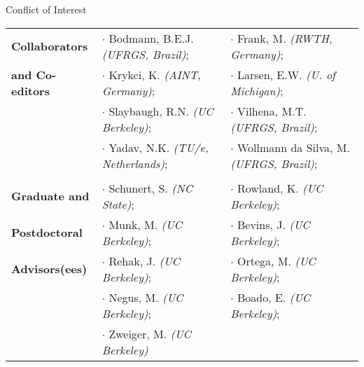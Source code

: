 \documentclass{resume3} %
\begin{document}
\vspace*{0.5em}
\begin{rSection}{Conflict of Interest}
\begin{tabular}{ @{} l @{\hspace{2ex}} l @{\hspace{3ex}} l }
\textbf{Collaborators}
& {\hspace{0em}}$\cdot$ Bodmann, B.E.J. \textit{(UFRGS, Brazil)};
& {\hspace*{0 em}}$\cdot$ Frank, M. \textit{(RWTH, Germany)};\\
\textbf{and Co-editors}
& {\hspace{0em}}$\cdot$ Krykci, K. \textit{(AINT, Germany)}; 
& {\hspace*{0 em}}$\cdot$ Larsen, E.W. \textit{(U. of Michigan)}; \\
& {\hspace{0em}}$\cdot$ Slaybaugh, R.N. \textit{(UC Berkeley)}; 
& {\hspace*{0 em}}$\cdot$ Vilhena, M.T. \textit{(UFRGS, Brazil)}; \\
& {\hspace{0em}}$\cdot$ Yadav, N.K. \textit{(TU/e, Netherlands)};
& {\hspace{0em}}$\cdot$ Wollmann da Silva, M. \textit{(UFRGS, Brazil)};\\
\quad \vspace{-5pt}\\
\textbf{Graduate and}
& {\hspace{0em}}$\cdot$ Schunert, S. \textit{(NC State)};
& {\hspace*{0 em}}$\cdot$ Rowland, K. \textit{(UC Berkeley)};\\
\textbf{Postdoctoral}
& {\hspace{0em}}$\cdot$ Munk, M. \textit{(UC Berkeley)}; 
& {\hspace*{0 em}}$\cdot$ Bevins, J. \textit{(UC Berkeley)}; \\
\textbf{Advisors(ees)}
& {\hspace{0em}}$\cdot$ Rehak, J. \textit{(UC Berkeley)}; & {\hspace{0em}}$\cdot$ Ortega, M. \textit{(UC Berkeley)}; \\
& {\hspace{0em}}$\cdot$ Negus, M. \textit{(UC Berkeley)}; & {\hspace{0em}}$\cdot$ Boado, E. \textit{(UC Berkeley)}; \\
& {\hspace{0em}}$\cdot$ Zweiger, M. \textit{(UC Berkeley)}
\end{tabular}
\end{rSection}

\end{document}
